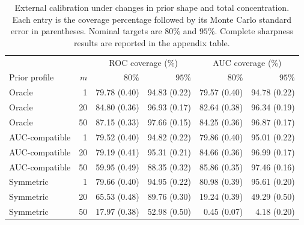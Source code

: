 \begin{table}[t]
\centering
\caption{External calibration under changes in prior shape and total concentration. Each entry is the coverage percentage followed by its Monte Carlo standard error in parentheses. Nominal targets are $80\%$ and $95\%$. Complete sharpness results are reported in the appendix table.}
\label{tab:sensitivity-to-prior-specification-external-coverage}
\begingroup
\small
\setlength{\tabcolsep}{4.2pt}
\renewcommand{\arraystretch}{1.12}
\begin{tabular}{@{}lrrrrr@{}}
\hline
 & & \multicolumn{2}{c}{ROC coverage (\%)} & \multicolumn{2}{c}{AUC coverage (\%)} \\
Prior profile & $m$ & $80\%$ & $95\%$ & $80\%$ & $95\%$ \\
\hline
Oracle & 1 & 79.78 (0.40) & 94.83 (0.22) & 79.57 (0.40) & 94.78 (0.22) \\
Oracle & 20 & 84.80 (0.36) & 96.93 (0.17) & 82.64 (0.38) & 96.34 (0.19) \\
Oracle & 50 & 87.15 (0.33) & 97.66 (0.15) & 84.25 (0.36) & 96.87 (0.17) \\
AUC-compatible & 1 & 79.52 (0.40) & 94.82 (0.22) & 79.86 (0.40) & 95.01 (0.22) \\
AUC-compatible & 20 & 79.19 (0.41) & 95.31 (0.21) & 84.66 (0.36) & 96.99 (0.17) \\
AUC-compatible & 50 & 59.95 (0.49) & 88.35 (0.32) & 85.86 (0.35) & 97.46 (0.16) \\
Symmetric & 1 & 79.66 (0.40) & 94.95 (0.22) & 80.98 (0.39) & 95.61 (0.20) \\
Symmetric & 20 & 65.53 (0.48) & 89.76 (0.30) & 19.24 (0.39) & 49.29 (0.50) \\
Symmetric & 50 & 17.97 (0.38) & 52.98 (0.50) & 0.45 (0.07) & 4.18 (0.20) \\
\hline
\end{tabular}
\endgroup
\end{table}
